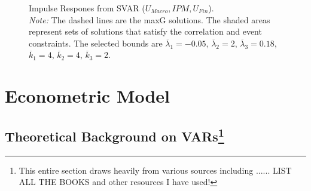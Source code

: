 \documentclass[a4paper,11pt,listof=nochaptergap,oneside,pointednumbers,bibtotoc,bigheadings,liststotoc]{scrbook}
\theoremstyle{mysatz}
\theoremstyle{mydefinition}
\theoremstyle{mybemerkung}
\begin{document}
\begin{itemize}
\begin{figure}[!h]
   \centering
   \setlength\fboxsep{0pt}
   \setlength\fboxrule{0pt}
      \caption[Impulse Respones from SVAR ($U_{Macro}, IPM, U_{Fin}$).]{Impulse Respones from SVAR ($U_{Macro}, IPM, U_{Fin}$).\\
      \textit{Note:}  The dashed lines are the maxG solutions. The shaded areas represent sets of solutions that satisfy the correlation and event constraints. The selected bounds are $\overline{\lambda}_1 = -0.05$, $\overline{\lambda}_2 = 2$, $\overline{\lambda}_3 = 0.18$, $\overline{k}_1 = 4$, $\overline{k}_2 = 4$, $\overline{k}_3 = 2$.}   \label{fig:impulse.responses_all.SVAR}
\end{figure}


\chapter{Econometric Model}
\label{sec:EconometricModel}

\section[Theoretical Background on (S)VARs]{Theoretical Background on VARs\footnote{This entire section draws heavily from various sources including ...... LIST ALL THE BOOKS and other resources I have used!}}
\label{sec:TheoreticalBackgroundSVARs}


\end{itemize}
\end{document}
